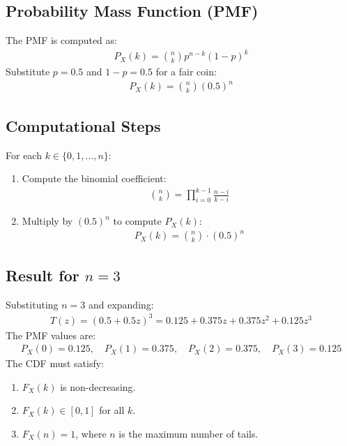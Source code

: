\documentclass[journal]{IEEEtran}
\begin{document}
\subsection*{Probability Mass Function (PMF)}
The PMF is computed as:
\begin{align}
P_X(k) = \binom{n}{k} p^{n-k} (1-p)^k
\end{align}
Substitute \(p = 0.5\) and \(1-p = 0.5\) for a fair coin:
\begin{align}
P_X(k) = \binom{n}{k} (0.5)^n
\end{align}

\subsection*{Computational Steps}
For each \(k \in \{0, 1, \dots, n\}\):
\begin{enumerate}
    \item Compute the binomial coefficient:
    \begin{align}
    \binom{n}{k} = \prod_{i=0}^{k-1} \frac{n-i}{k-i}
    \end{align}
    \item Multiply by \((0.5)^n\) to compute \(P_X(k)\):
    \begin{align}
    P_X(k) = \binom{n}{k} \cdot (0.5)^n
    \end{align}
\end{enumerate}

\subsection*{Result for \(n = 3\)}
Substituting \(n = 3\) and expanding:
\begin{align}
T(z) = (0.5 + 0.5z)^3 = 0.125 + 0.375z + 0.375z^2 + 0.125z^3
\end{align}
The PMF values are:
\begin{align}
P_X(0) = 0.125, \quad P_X(1) = 0.375, \quad P_X(2) = 0.375, \quad P_X(3) = 0.125
\end{align}
The CDF must satisfy:
\begin{enumerate}
    \item \(F_X(k)\) is non-decreasing.
    \item \(F_X(k) \in [0, 1]\) for all \(k\).
    \item \(F_X(n) = 1\), where \(n\) is the maximum number of tails.
\end{enumerate}
\end{document}
